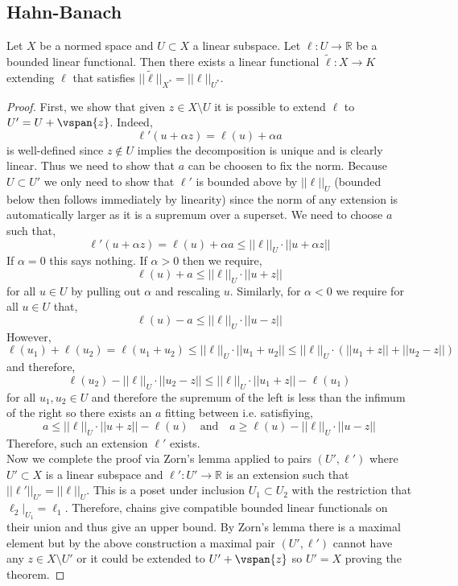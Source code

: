 \documentclass[12pt]{article}
\newcommand{\R}{\mathbb{R}}
\begin{document}
\subsection{Hahn-Banach}

\begin{thm}
Let $X$ be a normed space and $U \subset X$ a linear subspace. Let $\ell : U \to \R$ be a bounded linear functional. Then there exists a linear functional $\tilde{\ell} : X \to K$ extending $\ell$ that satisfies $|| \tilde{\ell} ||_{X^*} = || \ell ||_{U^*}$.
\end{thm}

\begin{proof}
First, we show that given $z \in X \setminus U$ it is possible to extend $\ell$ to $U' = U + \vspan{z}$. Indeed,
\[ \ell'(u + \alpha z) = \ell(u) + \alpha a \]
is well-defined since $z \notin U$ implies the decomposition is unique and is clearly linear. Thus we need to show that $a$ can be choosen to fix the norm. Because $U \subset U'$ we only need to show that $\ell'$ is bounded above by $|| \ell ||_{U}$ (bounded below then follows immediately by linearity) since the norm of any extension is automatically larger as it is a supremum over a superset. We need to choose $a$ such that,
\[ \ell'(u + \alpha z) = \ell(u) + \alpha a \le ||\ell||_{U} \cdot || u + \alpha z || \]
If $\alpha = 0$ this says nothing. If $\alpha > 0$ then we require,
\[ \ell(u) + a \le || \ell ||_{U} \cdot || u + z || \]
for all $u \in U$ by pulling out $\alpha$ and rescaling $u$. Similarly, for $\alpha < 0$ we require for all $u \in U$ that,
\[ \ell(u) - a \le || \ell ||_{U} \cdot || u - z || \]
However, 
\[ \ell(u_1) + \ell(u_2) = \ell(u_1 + u_2) \le || \ell ||_{U} \cdot || u_1 + u_2 || \le || \ell ||_{U} \cdot (||u_1 + z|| + || u_2 - z ||) \]
and therefore,
\[ \ell(u_2) - || \ell ||_U \cdot ||u_2 - z || \le || \ell ||_U \cdot || u_1 + z || - \ell(u_1) \]
for all $u_1, u_2 \in U$ and therefore the supremum of the left is less than the infimum of the right so there exists an $a$ fitting between i.e. satisfiying,
\[ a \le || \ell ||_U \cdot || u + z || - \ell(u) \quad \text{and} \quad  a \ge \ell(u) - || \ell ||_U \cdot || u - z || \]
Therefore, such an extension $\ell'$ exists. 
\bigskip\\
Now we complete the proof via Zorn's lemma applied to pairs $(U', \ell')$ where $U' \subset X$ is a linear subspace and $\ell' : U' \to \R$ is an extension such that $|| \ell' ||_{U'} = || \ell ||_U$. This is a poset under inclusion $U_1 \subset U_2$ with the restriction that $\ell_2 |_{U_1} = \ell_1$. Therefore, chains give compatible bounded linear functionals on their union and thus give an upper bound. By Zorn's lemma there is a maximal element but by the above construction a maximal pair $(U', \ell')$ cannot have any $z \in X \setminus U'$ or it could be extended to $U' + \vspan{z}$ so $U' = X$ proving the theorem. 
\end{proof}
\end{document}
